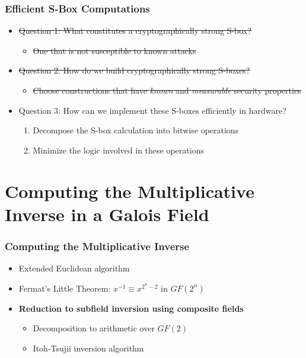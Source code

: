 \documentclass[handout,10pt]{beamer}
\begin{document}
\begin{frame}
\frametitle{Efficient S-Box Computations}
	\begin{itemize}
		\item \sout{Question 1: What constitutes a cryptographically strong S-box?}
		\medskip
		\begin{itemize}
			\item \sout{One that is not susceptible to known attacks}
		\end{itemize}
		\medskip
		\item \sout{Question 2: How do we build cryptographically strong S-boxes?}
		\medskip
		\begin{itemize}
			\item \sout{Choose constructions that have \emph{known} and \emph{measurable} security properties}
		\end{itemize}
		\medskip
		\item Question 3: How can we implement these S-boxes efficiently in hardware?
		\medskip
		\begin{enumerate}
			\item Decompose the S-box calculation into bitwise operations
			\item Minimize the logic involved in these operations
		\end{enumerate}
	\end{itemize}
\end{frame}

\section{Computing the Multiplicative Inverse in a Galois Field}
\begin{frame}
	\frametitle{Computing the Multiplicative Inverse}
	\begin{itemize}
		\item Extended Euclidean algorithm
		\pause
		\item Fermat's Little Theorem: $x^{-1} \equiv x^{2^n - 2}$ in $GF(2^n)$
		\pause
		\item \textbf{Reduction to subfield inversion using composite fields}
		\pause
		\begin{itemize}
			\item Decomposition to arithmetic over $GF(2)$ 
			\pause
			\item Itoh-Tsujii inversion algorithm
		\end{itemize}
	\end{itemize}
\end{frame}
\end{document}

